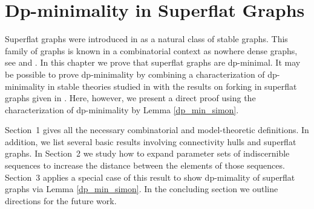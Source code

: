 \chapter{Dp-minimality in Superflat Graphs}
Superflat graphs were introduced in \cite{stable_graphs} as a natural class of stable graphs.
This family of graphs is known in a combinatorial context as nowhere dense graphs, see \cite{adleradler} and \cite{nowhere}.
In this chapter we prove that superflat graphs are dp-minimal.
It may be possible to prove dp-minimality by combining a characterization of dp-minimality in stable theories studied in \cite{dpstable}
with the results on forking in superflat graphs given in \cite{ivanov}.
Here, however, we present a direct proof using the characterization of dp-minimality by Lemma \ref{dp_min_simon}.

Sec\-tion~1 gives all the necessary combinatorial and model-theoretic definitions.
In addition, we list several basic results involving connectivity hulls and superflat graphs.
In Sec\-tion~2 we study how to expand parameter sets of indiscernible sequences to increase the distance between the elements of those sequences.
Sec\-tion~3 applies a special case of this result to show dp-mimality of superflat graphs via Lemma \ref{dp_min_simon}.
In the concluding section we outline directions for the future work.

